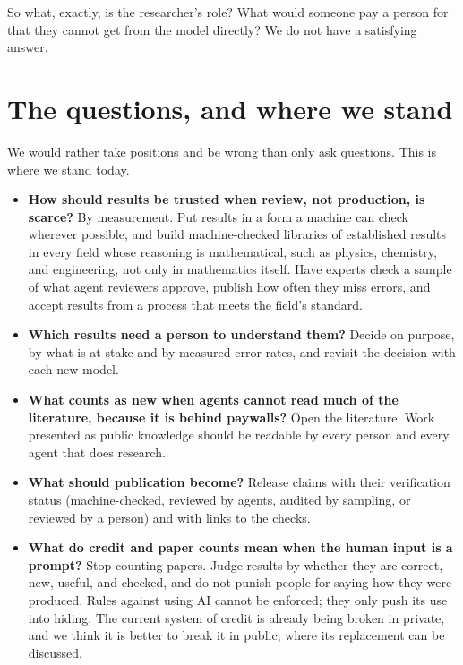 \documentclass[11pt]{article}
\begin{document}
So what, exactly, is the researcher's role?
What would someone pay a person for that they cannot get from the model directly?
We do not have a satisfying answer.

\section*{The questions, and where we stand}

We would rather take positions and be wrong than only ask questions.
This is where we stand today.

\begin{itemize}
  \item \textbf{How should results be trusted when review, not production, is scarce?}
  By measurement.
  Put results in a form a machine can check wherever possible, and build machine-checked libraries of established results in every field whose reasoning is mathematical, such as physics, chemistry, and engineering, not only in mathematics itself.
  Have experts check a sample of what agent reviewers approve, publish how often they miss errors, and accept results from a process that meets the field's standard.

  \item \textbf{Which results need a person to understand them?}
  Decide on purpose, by what is at stake and by measured error rates, and revisit the decision with each new model.

  \item \textbf{What counts as new when agents cannot read much of the literature, because it is behind paywalls?}
  Open the literature.
  Work presented as public knowledge should be readable by every person and every agent that does research.

  \item \textbf{What should publication become?}
  Release claims with their verification status (machine-checked, reviewed by agents, audited by sampling, or reviewed by a person) and with links to the checks.

  \item \textbf{What do credit and paper counts mean when the human input is a prompt?}
  Stop counting papers.
  Judge results by whether they are correct, new, useful, and checked, and do not punish people for saying how they were produced.
  Rules against using AI cannot be enforced; they only push its use into hiding.
  The current system of credit is already being broken in private, and we think it is better to break it in public, where its replacement can be discussed.


\end{itemize}
\end{document}
